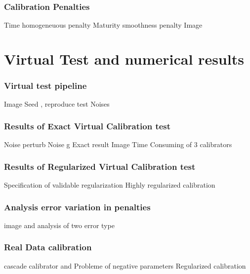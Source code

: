 \documentclass[8pt]{beamer}
\begin{document}
\begin{frame}
\frametitle{Calibration Penalties}
Time homogeneuous penalty
Maturity smoothness penalty
Image 
\end{frame}

\section{Virtual Test and numerical results}

\begin{frame}
\frametitle{Virtual test pipeline}
Image
Seed , reproduce test
Noises
\end{frame}


\begin{frame}
\frametitle{Results of Exact Virtual Calibration test}
Noise perturb
Noise g
Exact result
Image Time Consuming of 3 calibrators
\end{frame}


\begin{frame}
\frametitle{Results of Regularized Virtual Calibration test}
Specification of validable regularization
Highly regularized calibration
\end{frame}

\begin{frame}
\frametitle{Analysis error variation in penalties}
image and analysis of two error type
\end{frame}


\begin{frame}
\frametitle{Real Data calibration}
cascade calibrator and Probleme of negative parameters 
Regularized calibration
\end{frame}
\end{document}
